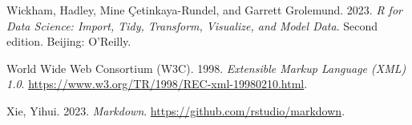 \documentclass[
  letterpaper,
]{scrbook}
\newlength{\cslhangindent}
\newlength{\cslentryspacingunit} %
\newenvironment{CSLReferences}[2] %
 {%
  \setlength{\parindent}{0pt}
  \ifodd #1
  \let\oldpar\par
  \def\par{\hangindent=\cslhangindent\oldpar}
  \fi
  \setlength{\parskip}{#2\cslentryspacingunit}
 }%
 {}
\begin{document}
\begin{CSLReferences}{1}{0}
\leavevmode{}%
Wickham, Hadley, Mine Çetinkaya-Rundel, and Garrett Grolemund. 2023.
\emph{R for Data Science: Import, Tidy, Transform, Visualize, and Model
Data}. Second edition. {Beijing}: {O'Reilly}.

\leavevmode{}%
World Wide Web Consortium (W3C). 1998. \emph{Extensible {Markup
Language} ({XML}) 1.0}.
\url{https://www.w3.org/TR/1998/REC-xml-19980210.html}.

\leavevmode{}%
Xie, Yihui. 2023. \emph{Markdown}.
\url{https://github.com/rstudio/markdown}.

\end{CSLReferences}


\backmatter
\end{document}
